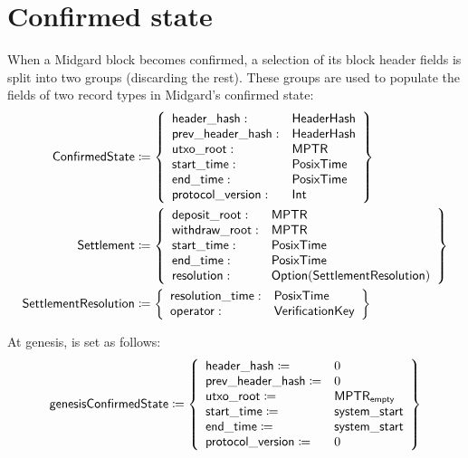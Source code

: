 \documentclass[../midgard.tex]{subfiles}
\begin{document}
\section{Confirmed state}
\label{h:confirmed-state}

When a Midgard block becomes confirmed, a selection of its block header fields is split into two groups (discarding the rest).
These groups are used to populate the fields of two record types in Midgard's confirmed state:
\begingroup
\allowdisplaybreaks
\begin{align*}
    \mathsf{ConfirmedState} &\coloneq \left\{
    \begin{array}{ll}
        \mathsf{header\_hash} : & \mathsf{HeaderHash} \\
        \mathsf{prev\_header\_hash} : & \mathsf{HeaderHash} \\
        \mathsf{utxo\_root} : & \mathsf{MPTR} \\
        \mathsf{start\_time} : & \mathsf{PosixTime} \\
        \mathsf{end\_time} : & \mathsf{PosixTime} \\
        \mathsf{protocol\_version} : & \mathsf{Int} \\
    \end{array} \right\} \\
    \mathsf{Settlement} &\coloneq \left\{
    \begin{array}{ll}
        \mathsf{deposit\_root} : & \mathsf{MPTR} \\
        \mathsf{withdraw\_root} : & \mathsf{MPTR} \\
        \mathsf{start\_time}: & \mathsf{PosixTime} \\
        \mathsf{end\_time}: & \mathsf{PosixTime} \\
        \mathsf{resolution}: & \mathsf{Option}(\mathsf{SettlementResolution})
    \end{array} \right\} \\
    \mathsf{SettlementResolution} &\coloneq \left\{
    \begin{array}{ll}
        \mathsf{resolution\_time}: & \mathsf{PosixTime} \\
        \mathsf{operator}: & \mathsf{VerificationKey}
    \end{array}
    \right\}
\end{align*}
\endgroup

At genesis,  is set as follows:
\begin{equation*}
    \mathsf{genesisConfirmedState} \coloneq \left\{
        \begin{array}{ll}
            \mathsf{header\_hash} \coloneq & 0 \\
            \mathsf{prev\_header\_hash} \coloneq & 0 \\
            \mathsf{utxo\_root} \coloneq & \mathsf{MPTR}_{\mathsf{empty}} \\
            \mathsf{start\_time} \coloneq & \mathsf{system\_start} \\
            \mathsf{end\_time} \coloneq & \mathsf{system\_start} \\
            \mathsf{protocol\_version} \coloneq & 0
        \end{array} \right\}
\end{equation*}
\end{document}
